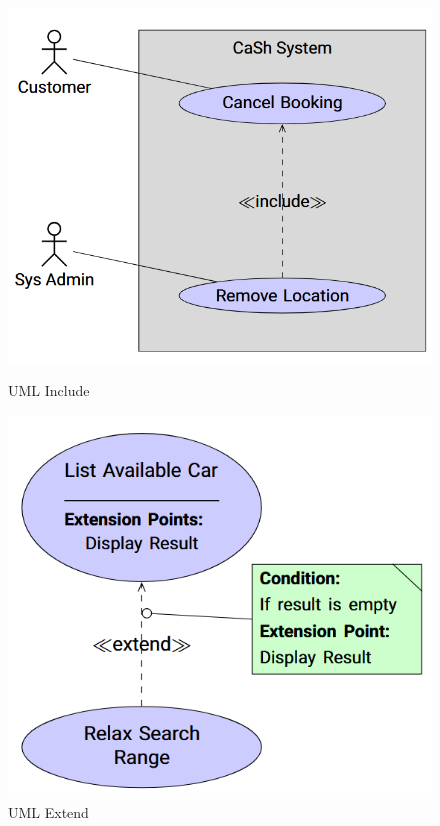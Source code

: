 \documentclass[
../../Software_Engineering_Summary.tex,
]
{subfiles}
\begin{document}
\begin{figure}[htp]
    \begin{minipage}
        [htp]{0.5\textwidth}
        \centering
        \includegraphics[scale=0.5]{Pics/UML_Include.png}
        \caption{UML Include}
    \end{minipage}
    \hfill
    \begin{minipage}
        [htp]{0.5\textwidth}
        \centering
        \includegraphics[scale=0.5]{Pics/UML_Extends.png}
        \caption{UML Extend}
    \end{minipage}
\end{figure}
\end{document}
